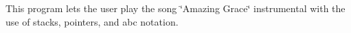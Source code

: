 This program lets the user play the song \char`\"{}\+Amazing Grace\char`\"{} instrumental with the use of stacks, pointers, and abc notation. 